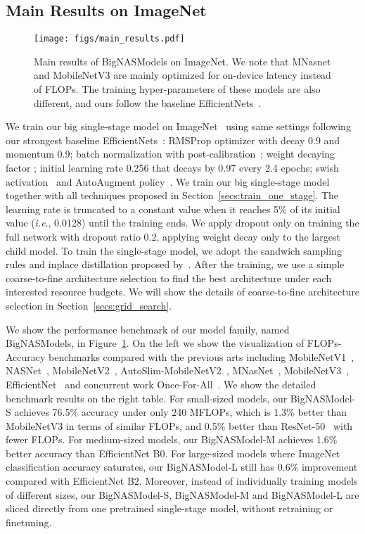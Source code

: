 \documentclass[runningheads]{llncs}
\def\onedot{.}
\def\ie{\emph{i.e}\onedot} \def\Ie{\emph{I.e}\onedot}
\begin{document}
\subsection{Main Results on ImageNet}
\begin{figure}[ht]
\centering
\texttt{[image: figs/main\_results.pdf]}
\caption{Main results of BigNASModels on ImageNet. We note that MNasnet and MobileNetV3 are mainly optimized for on-device latency instead of FLOPs. The training hyper-parameters of these models are also different, and ours follow the baseline EfficientNets~\cite{tan2019efficientnet}.}
\label{figs:bignasnet}
\end{figure}

We train our big single-stage model on ImageNet~\cite{deng2009imagenet} using same settings following our strongest baseline EfficientNets~\cite{tan2019efficientnet}: RMSProp optimizer with decay 0.9 and momentum 0.9; batch normalization with post-calibration~\cite{yu2019universally}; weight decaying factor ; initial learning rate 0.256 that decays by 0.97 every 2.4 epochs; swish activation~\cite{ramachandran2018searching} and AutoAugment policy~\cite{cubuk2019autoaugment}. We train our big single-stage model together with all techniques proposed in Section~\ref{secs:train_one_stage}. The learning rate is truncated to a constant value when it reaches 5\% of its initial value (\ie, 0.0128) until the training ends. We apply dropout only on training the full network with dropout ratio 0.2, applying weight decay only to the largest child model. To train the single-stage model, we adopt the sandwich sampling rules and inplace distillation proposed by~\cite{yu2019universally}. After the training, we use a simple coarse-to-fine architecture selection to find the best architecture under each interested resource budgets. We will show the details of coarse-to-fine architecture selection in Section~\ref{secs:grid_search}.

We show the performance benchmark of our model family, named BigNASModels, in Figure~\ref{figs:bignasnet}. On the left we show the visualization of FLOPs-Accuracy benchmarks compared with the previous arts including MobileNetV1~\cite{howard2017mobilenets}, NASNet~\cite{zoph2018learning}, MobileNetV2~\cite{sandler2018inverted}, AutoSlim-MobileNetV2~\cite{yu2019network}, MNasNet~\cite{tan2018mnasnet}, MobileNetV3~\cite{howard2019searching}, EfficientNet~\cite{tan2019efficientnet} and concurrent work Once-For-All~\cite{cai2019once}. We show the detailed benchmark results on the right table. For small-sized models, our BigNASModel-S achieves 76.5\% accuracy under only 240 MFLOPs, which is 1.3\% better than MobileNetV3 in terms of similar FLOPs, and 0.5\% better than ResNet-50~\cite{he2016deep} with  fewer FLOPs. For medium-sized models, our BigNASModel-M achieves 1.6\% better accuracy than EfficientNet B0. For large-sized models where ImageNet classification accuracy saturates, our BigNASModel-L still has 0.6\% improvement compared with EfficientNet B2. Moreover, instead of individually training models of different sizes, our BigNASModel-S, BigNASModel-M and BigNASModel-L are sliced directly from one pretrained single-stage model, without retraining or finetuning.
\end{document}
